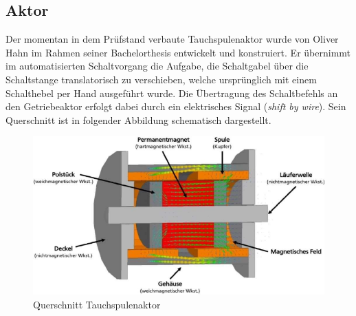 \subsection{Aktor}

Der momentan in dem Prüfstand verbaute Tauchspulenaktor wurde von Oliver Hahn im Rahmen seiner Bachelorthesis entwickelt und konstruiert. Er übernimmt im automatisierten Schaltvorgang die Aufgabe, die Schaltgabel  über die Schaltstange translatorisch zu verschieben, welche ursprünglich mit einem Schalthebel per Hand ausgeführt wurde. Die Übertragung des Schaltbefehls an den Getriebeaktor erfolgt dabei durch ein elektrisches Signal (\textit{shift by wire}).
Sein Querschnitt ist in folgender Abbildung schematisch dargestellt.

\begin{figure}[h]
	\centering
		\includegraphics{Bilder/QuerschnittAktor.pdf}
	\caption{Querschnitt Tauchspulenaktor \cite[S.30]{Hahn2018}}
	\label{fig:Querschnitt Aktor}
\end{figure}


